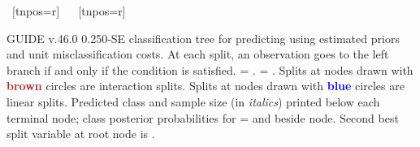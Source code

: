 \documentclass{article}
\begin{document}
\begin{landscape}
\begin{center}
{{{{{    ~[tnpos=r]{}
    ~{}
   }
   }
    ~[tnpos=r]{}
    ~{}
   }
 }
 }
 \end{center}
GUIDE v.46.0 0.250-SE
classification tree for predicting \texttt{} using
estimated priors
and unit misclassification costs.
At each split, an observation goes to the left branch 
 if and only if the condition is satisfied.
\texttt{} = \texttt{}.
\texttt{} = \texttt{}.
 Splits at nodes drawn with \textbf{\textcolor{brown}{brown}} circles are interaction splits.
 Splits at nodes drawn with \textbf{\textcolor{blue}{blue}} circles are linear splits.
Predicted class and sample size (in \emph{italics}) printed below each terminal node;
class posterior probabilities for \texttt{} =
 \texttt{} and \texttt{} beside node.
 Second best split variable at root node is \texttt{}.
 \end{landscape}
 
\end{document}
